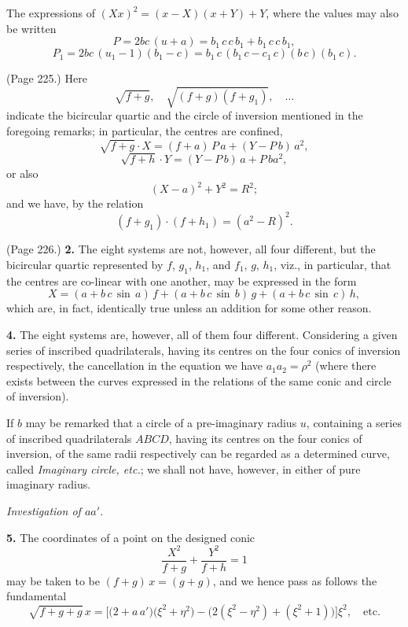 \documentclass[11pt,a4paper]{book}
\begin{document}
The expressions of $(X x)^2 = (x - X)(x + Y) + Y$, where the values may also be written
\[
P = 2 b c\,(u + a) = b_1\,c\,c\,b_1 + b_1\,c\,c\,b_1,
\]
\[
P_1 = 2 b c\,(u_1 - 1)(b_1 - c) = b_1\,c\,(b_1\,c - c_1\,c)(b\,c)(b_1\,c).
\]

\medskip

\noindent (Page 225.) Here
\[
\sqrt{f + g}, \quad \sqrt{(f + g)(f + g_1)}, \quad \ldots
\]
indicate the bicircular quartic and the circle of inversion mentioned in the foregoing remarks; in particular, the centres are confined,
\[
\sqrt{f + g}\cdot X = (f + a)\,P\,a + (Y - P\,b)\,a^2,
\]
\[
\sqrt{f + h}\cdot Y = (Y - P\,b)\,a + P\,b a^2,
\]
or also
\[
(X - a)^2 + Y^2 = R^2;
\]
and we have, by the relation
\[
( f + g_1) \cdot (f + h_1) = (a^2 - R)^2.
\]

\medskip

\noindent (Page 226.) \textbf{2.} The eight systems are not, however, all four different, but the bicircular quartic represented by $f$, $g_1$, $h_1$, and $f_1$, $g$, $h_1$, viz., in particular, that the centres are co-linear with one another, may be expressed in the form
\[
X = (a + b\,c\,\sin\,a)\,f + (a + b\,c\,\sin\,b)\,g + (a + b\,c\,\sin\,c)\,h,
\]
which are, in fact, identically true unless an addition for some other reason.

\medskip

\noindent\textbf{4.} The eight systems are, however, all of them four different. Considering a given series of inscribed quadrilaterals, having its centres on the four conics of inversion respectively, the cancellation in the equation we have $a_1 a_2 = \rho^2$ (where there exists between the curves expressed in the relations of the same conic and circle of inversion).

If $b$ may be remarked that a circle of a pre-imaginary radius $u$, containing a series of inscribed quadrilaterals $A B C D$, having its centres on the four conics of inversion, of the same radii respectively can be regarded as a determined curve, called \textit{Imaginary circle, etc.}; we shall not have, however, in either of pure imaginary radius.

\medskip

\noindent\textit{Investigation of $a a'$.}

\medskip

\noindent\textbf{5.} The coordinates of a point on the designed conic
\[
\frac{X^2}{f + g} + \frac{Y^2}{f + h} = 1
\]
may be taken to be $(f + g)\,x = (g + g)$, and we hence pass as follows the fundamental
\[
\sqrt{f + g + g}\,x = \big[ \big(2 + a\,a'\big)\big(\xi^2 + \eta^2\big) - \big(2(\xi^2 - \eta^2) + (\xi^2 + 1)\big)\big] \xi^2, \quad \text{etc.}
\]
\end{document}
